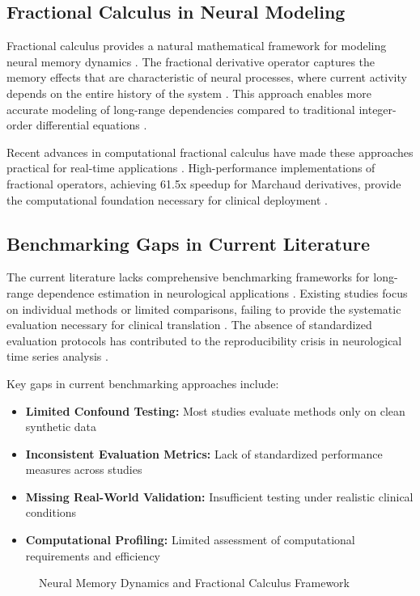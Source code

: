 \subsection{Fractional Calculus in Neural Modeling}

Fractional calculus provides a natural mathematical framework for modeling neural memory dynamics \citep{Karniadakis2021}. The fractional derivative operator captures the memory effects that are characteristic of neural processes, where current activity depends on the entire history of the system \citep{Wang2022}. This approach enables more accurate modeling of long-range dependencies compared to traditional integer-order differential equations \citep{Li2021}.

Recent advances in computational fractional calculus have made these approaches practical for real-time applications \citep{Raubitzek2022}. High-performance implementations of fractional operators, achieving 61.5x speedup for Marchaud derivatives, provide the computational foundation necessary for clinical deployment \citep{Kang2024}.

\subsection{Benchmarking Gaps in Current Literature}

The current literature lacks comprehensive benchmarking frameworks for long-range dependence estimation in neurological applications \citep{Mill2017}. Existing studies focus on individual methods or limited comparisons, failing to provide the systematic evaluation necessary for clinical translation \citep{Fornito2016}. The absence of standardized evaluation protocols has contributed to the reproducibility crisis in neurological time series analysis \citep{Marasco2012}.

Key gaps in current benchmarking approaches include:
\begin{itemize}
    \item \textbf{Limited Confound Testing:} Most studies evaluate methods only on clean synthetic data
    \item \textbf{Inconsistent Evaluation Metrics:} Lack of standardized performance measures across studies
    \item \textbf{Missing Real-World Validation:} Insufficient testing under realistic clinical conditions
    \item \textbf{Computational Profiling:} Limited assessment of computational requirements and efficiency
\end{itemize}

\begin{figure}[h]
\centering
\caption{Neural Memory Dynamics and Fractional Calculus Framework}
\label{fig:neural_memory_dynamics}
\end{figure}
